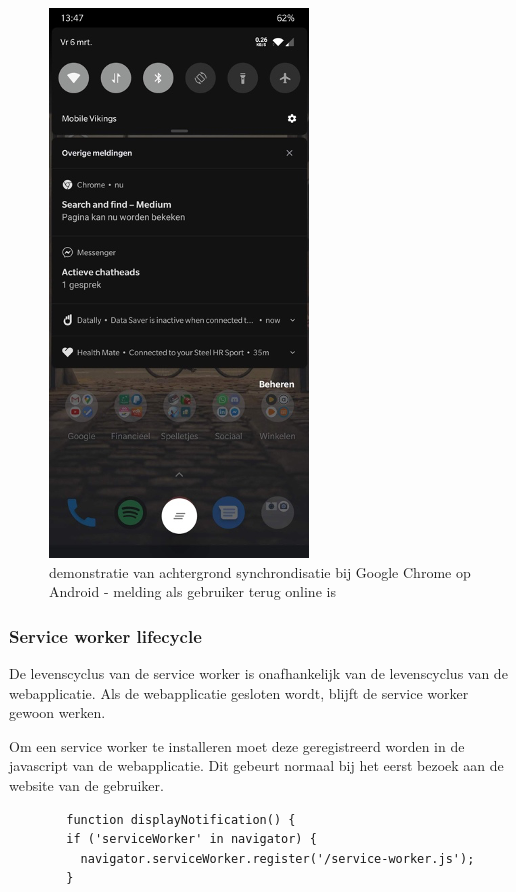 		\begin{figure}[!htb]
			\centering
			\includegraphics{./img/backSync2.png}
			\caption{demonstratie van achtergrond synchrondisatie bij Google Chrome op Android - melding als gebruiker terug online is}
		\end{figure}
		 
	
	
		\subsubsection{Service worker lifecycle }
		De levenscyclus van de service worker is onafhankelijk van de levenscyclus van de webapplicatie. Als de webapplicatie gesloten wordt, blijft de service worker gewoon werken.
		
		Om een service worker te installeren moet deze geregistreerd worden in de javascript van de webapplicatie. Dit gebeurt normaal bij het eerst bezoek aan de website van de gebruiker.
		
		\begin{lstlisting}
		function displayNotification() {
		if ('serviceWorker' in navigator) {
		  navigator.serviceWorker.register('/service-worker.js');
		}
		
		\end{lstlisting}
	
